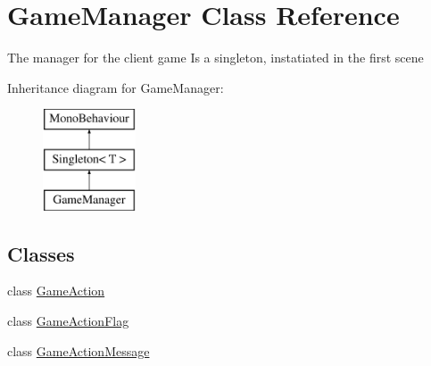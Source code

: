 \hypertarget{class_game_manager}{\section{Game\-Manager Class Reference}
\label{class_game_manager}
}


The manager for the client game Is a singleton, instatiated in the first scene  


Inheritance diagram for Game\-Manager\-:\begin{figure}[H]
\begin{center}
\leavevmode
\includegraphics[height=3.000000cm]{class_game_manager}
\end{center}
\end{figure}
\subsection*{Classes}
\begin{DoxyCompactItemize}
\item 
class \hyperlink{class_game_manager_1_1_game_action}{Game\-Action}
\item 
class \hyperlink{class_game_manager_1_1_game_action_flag}{Game\-Action\-Flag}
\item 
class \hyperlink{class_game_manager_1_1_game_action_message}{Game\-Action\-Message}
\end{DoxyCompactItemize}
